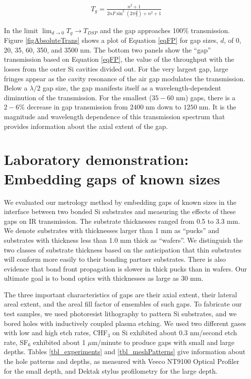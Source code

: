 \documentclass[osajnl,preprint,showpacs,superscriptaddress,12pt]{revtex4-1} %
\begin{document}
\begin{eqnarray}
T_{g} = \frac{n^2+1}{2 n F \sin ^2(2\pi \frac{d}{\lambda})+n^2+1} \label{eqFP}
\end{eqnarray}

In the limit $\lim_{d \to 0} T_g \rightarrow T_{DSP} $ and the gap approaches 100\% transmission.  Figure \ref{figAbsoluteTrans} shows a plot of Equation \ref{eqFP} for gap sizes, $d$, of 0, 20, 35, 60, 350, and 3500 nm.  The bottom two panels show the ``gap'' transmission based on Equation \ref{eqFP}, the value of the throughput with the losses from the outer Si cavities divided out.  For the very largest gap, large fringes appear as the cavity resonance of the air gap modulates the transmission.  Below a $\lambda/2$ gap size, the gap manifests itself as a wavelength-dependent diminution of the transmission.  For the smallest ($35-60$ nm) gaps, there is a $2-6\%$ decrease in gap transmission from $2400\;$nm down to $1250\;$nm.  It is the magnitude and wavelength dependence of this transmission spectrum that provides information about the axial extent of the gap.

\section{Laboratory demonstration: Embedding gaps of known sizes}

We evaluated our metrology method by embedding gaps of known sizes in the interface between two bonded Si substrates and measuring the effects of these gaps on IR transmission.  The substrate thicknesses ranged from 0.5 to 3.3 mm.  We denote substrates with thicknesses larger than 1 mm as ``pucks'' and substrates with thickness less than 1.0 mm thick as ``wafers''.  We distinguish the two classes of substrate thickness based on the anticipation that thin substrates will conform more easily to their bonding partner substrates.  There is also evidence that bond front propagation is slower in thick pucks \cite{2007ApOpt..46.6793H} than in wafers.  Our ultimate goal is to bond optics with thicknesses as large as 30 mm.

The three important characteristics of gaps are their axial extent, their lateral areal extent, and the areal fill factor of ensembles of such gaps.  To fabricate our test samples, we used photoresist lithography to pattern Si substrates, and we bored holes with inductively coupled plasma etching.  We used two different gases with low and high etch rates, CHF$_3$ on Si exhibited about 0.3 nm/second etch rate, SF$_6$ exhibited about 1 $\mu$m/minute to produce gaps with small and large depths.  Tables \ref{tbl_experiments} and \ref{tbl_meshPatterns} give information about the hole patterns and depths, as measured with Veeco NT9100 Optical Profiler for the small depth, and Dektak stylus profilometry for the large depth.
\end{document}

